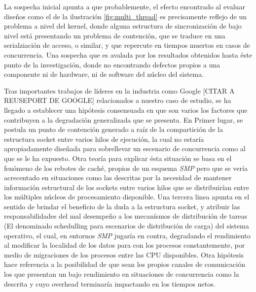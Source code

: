 La sospecha inicial apunta a que probablemente, el efecto encontrado al evaluar diseños como el de la ilustración \ref{fig:multi_thread} es precisamente reflejo de un problema a nivel del kernel, donde alguna estructura de sincronización de bajo nivel está presentando un problema de contención, que se traduce en una serialziación de acceso, o similar, y que repercute en tiempos muertos en casos de concurrencia. Una sospecha que es avalada por los resultados obtenidos hasta éste punto de la investigación, donde no encontrando defectos propios a una componente ni de hardware, ni de software del núcleo del sistema.

Tras importantes trabajos de líderes en la industria como Google [CITAR A REUSEPORT DE GOOGLE] relacionados a nuestro caso de estudio, se ha llegado a establecer una hipótesis consensuada en que son varios los factores que contribuyen a la degradación generalizada que se presenta. En Primer lugar, se postula un punto de contención generado a raíz de la compartición de la estructura socket entre varios hilos de ejecución, la cual no estaría apropiadamente diseñada para sobrellevar un escenario de concurrencia como al que se le ha expuesto. Otra teoría para explicar ésta situación se basa en el fenómeno de los rebotes de caché, propios de un esquema \emph{SMP} pero que se vería acrecentado en situaciones como las descritas por la necesidad de mantener información estructural de los sockets entre varios hilos que se distribuirían entre los múltiples núcleos de procesamiento disponible. Una tercera linea apunta en el sentido de brindar el beneficio de la duda a la estructura socket, y atribuir las responsabilidades del mal desempeño a los mecanísmos de distribución de tareas (El denominado schedulling para escenarios de distribución de carga) del sistema operativo, el cual, en entornos \emph{SMP} jugaría en contra, degradando el rendimiento al modificar la localidad de los datos para con los procesos constantemente, por medio de migraciones de los procesos entre las CPU disponibles. Otra hipótesis hace referencia a la posibilidad de que sean los propios canales de comunicación los que presentan un bajo rendimiento en situaciones de concurrencia como la descrita y cuyo overhead terminaría impactando en los tiempos netos.

